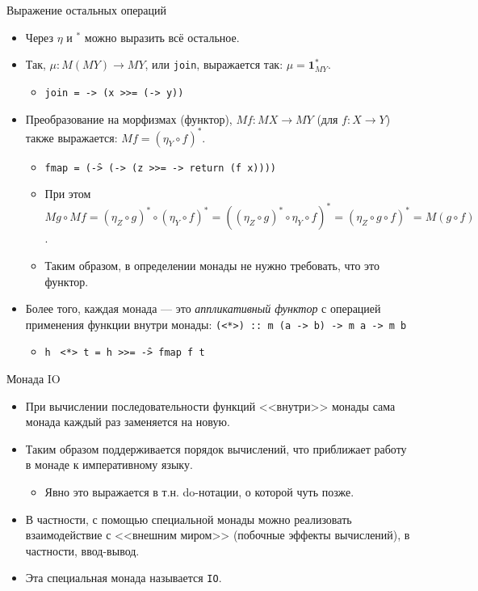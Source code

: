 \documentclass[xcolor=dvipsnames]{beamer}
\newcommand{\One}{\mathbf{1}}
\begin{document}
\begin{frame}{Выражение остальных операций}

\begin{itemize}[<+->]
 \item Через $\eta$ и $^*$ можно выразить всё остальное.
 \item Так, $\mu \colon M(MY) \to MY$, или {\tt join}, выражается так: $\mu = \One_{MY}^*$.
 \begin{itemize}
 \item \texttt{join = \x -> (x >>= (\y -> y))}
 \end{itemize}
 \item Преобразование на морфизмах (функтор), $Mf \colon MX \to MY$ (для $f \colon X \to Y$) также выражается: $Mf = (\eta_Y \circ f)^*$.
 \begin{itemize}
 \item \texttt{fmap = (\f -> (\z -> (z >>= \x -> return (f x))))}
 \item При этом $Mg \circ Mf = (\eta_Z \circ g)^* \circ (\eta_Y \circ f)^* = ((\eta_Z \circ g)^* \circ \eta_Y \circ f)^* = (\eta_Z \circ g \circ f)^* = M(g \circ f)$.
 \item Таким образом, в определении монады не нужно требовать, что это функтор.
 \end{itemize}
 \item Более того, каждая монада --- это {\em аппликативный функтор} с операцией применения функции внутри монады:
 \texttt
 {(<*>) :: m (a -> b) -> m a -> m b}
 \begin{itemize}
 \item
  \texttt{h } \texttt{<*> t = h >>= \f -> fmap f t}
 \end{itemize}
\end{itemize}

 
\end{frame}

\begin{frame}{Монада IO}
 
 
 \begin{itemize}[<+->]
  \item При вычислении последовательности функций <<внутри>> монады сама монада каждый раз заменяется на новую.
  \item Таким образом поддерживается порядок вычислений, что приближает работу в монаде к императивному языку.
  \begin{itemize}
  \item Явно это выражается в т.н. do-нотации, о которой чуть позже.
  \end{itemize}
  \item В частности, с помощью специальной монады можно реализовать взаимодействие с <<внешним миром>> (побочные эффекты вычислений), в частности, ввод-вывод.
  \item Эта специальная монада называется \texttt{IO}.
 \end{itemize}

 
\end{frame}
\end{document}

